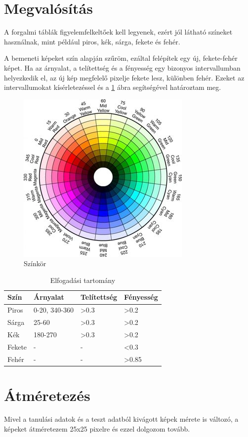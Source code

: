 \section{Megvalósítás}\label{sec:PREPROC:implement}

A forgalmi táblák figyelemfelkeltőek kell legyenek, ezért jól látható színeket használnak, mint például piros, kék, sárga, fekete és fehér.

A bemeneti képeket szín alapján szűröm, ezáltal felépítek egy új, fekete-fehér képet. Ha az árnyalat, a telítettség és a fényesség egy bizonyos intervallumban helyezkedik el, az új kép megfelelő pixelje fekete lesz, különben fehér. Ezeket az intervallumokat kísérletezéssel és a \ref{fig:colorWheel} ábra segítségével határoztam meg.

\begin{figure}[h]

\centering 
\includegraphics[scale=0.5]{ColorWheel}
\caption{Színkör}
\label{fig:colorWheel} 

\end{figure}

\begin{center}
\begin{table}[t]
\centering
\begin{tabular}{ |p{3cm}||p{3cm}|p{3cm}|p{3cm}|  }
 \hline
 Szín & Árnyalat & Telítettség & Fényesség\\
 \hline
 Piros   & 0-20, 340-360    &>0.3& >0.2\\
 Sárga &   25-60  & >0.3 & >0.2\\
 Kék & 180-270 & >0.3 & >0.2\\
 Fekete    & - & - & <0.3\\
 Fehér & -  & - & >0.85\\
 \hline
\end{tabular}


\caption{Elfogadási tartomány}
\label{table:1}
\end{table}
\end{center}

\section{Átméretezés}

Mivel a tanulási adatok és a teszt adatból kivágott képek mérete is változó, a képeket átméretezem 25x25 pixelre és ezzel dolgozom tovább.
